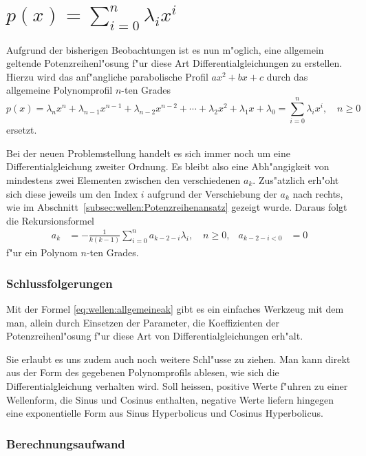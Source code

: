 \section{\texorpdfstring{$p(x) = \sum_{i=0}^{n}\lambda_ix^i$}{p(x) = summe i = 
0 bis n lambdai xi}}

Aufgrund der bisherigen Beobachtungen ist es nun m"oglich, eine 
allgemein geltende Potenzreihenl"osung f"ur diese Art Differentialgleichungen 
zu erstellen. Hierzu wird das anf"angliche parabolische Profil $ax^2 + bx + c$ 
durch das allgemeine Polynomprofil $n$-ten Grades
\begin{equation*}
	p(x) =
	\lambda_nx^n + \lambda_{n-1}x^{n-1} + \lambda_{n-2}x^{n-2} + \dotsb + 
	\lambda_2x^2 + \lambda_1x + \lambda_0 = \sum_{i=0}^{n}\lambda_ix^i, \quad n 
	\ge 0
\end{equation*}
ersetzt.

Bei der neuen Problemstellung handelt es sich immer noch um eine 
Differentialgleichung zweiter Ordnung. Es bleibt also eine Abh"angigkeit von 
mindestens zwei Elementen zwischen den verschiedenen $a_k$. Zus"atzlich erh"oht 
sich diese jeweils um den Index $i$ aufgrund der Verschiebung der $a_k$ nach 
rechts, wie im Abschnitt~\ref{subsec:wellen:Potenzreihenansatz} gezeigt wurde. 
Daraus folgt die Rekursionsformel
%
\begin{align}
	a_k &= -\frac{1}{k(k-1)}\sum_{i=0}^{n}a_{k-2-i}\lambda_i, \quad n \ge 0, 
	&a_{k-2-i < 0} &=  0
	\label{eq:wellen:allgemeineak}
\end{align}
f"ur ein Polynom $n$-ten Grades.

\subsubsection{Schlussfolgerungen}

Mit der Formel \eqref{eq:wellen:allgemeineak} gibt es ein einfaches 
Werkzeug mit dem man, allein durch Einsetzen der Parameter, die Koeffizienten 
der Potenzreihenl"osung f"ur diese Art von Differentialgleichungen erh"alt.

Sie erlaubt es uns zudem auch noch weitere Schl"usse zu ziehen. Man kann direkt 
aus der Form des gegebenen Polynomprofils ablesen, wie sich die 
Differentialgleichung verhalten wird. Soll heissen, positive Werte
f"uhren zu einer Wellenform, die Sinus und Cosinus enthalten, negative 
Werte liefern hingegen eine exponentielle Form aus Sinus Hyperbolicus und 
Cosinus Hyperbolicus.

\subsubsection{Berechnungsaufwand}








